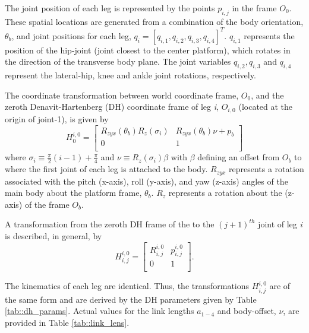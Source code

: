 			The \Jth joint position of each \Ith leg is represented  by the points ${p}_{i,j}$ in the frame $O_{0}$. These spatial locations are generated from a combination of the body orientation, $\theta_{b}$, and joint positions for each \Ith leg, $q_{i} = [q_{i,1}, q_{i,2}, q_{i,3}, q_{i,4}]^T$. $q_{i,1}$ represents the position of the hip-joint (joint closest to the center platform), which rotates in the direction of the transverse body plane. The joint variables $q_{i,2}, q_{i,3}$ and $q_{i,4}$ represent the lateral-hip, knee and ankle joint rotations, respectively.

			The coordinate transformation between world coordinate frame, $O_{0}$, and the zeroth Denavit-Hartenberg (DH) coordinate frame of leg \emph{i}, $O_{i,0}$ (located at the origin of joint-1), is given by
				\begin{equation}
					H_{0}^{i,0} = \left[ 
					\begin{array}{c|c}
						R_{zyx}(\theta_{b}) R_{z}(\sigma_{i})	&R_{zyx}(\theta_{b}) \nu + {p}_{b} 	\\ \hline
						0										&	1											\\
					\end{array} 
					\right]
					\label{eq::world_to_dh}
				\end{equation}
			where $\sigma_{i} \equiv \frac{\pi}{2}(i-1) + \frac{\pi}{4} $ and $\nu \equiv  R_{z}(\sigma_{i}) \beta$ with $\beta$ defining an offset from $O_{b}$ to where the first joint of each leg is attached to the body. $R_{zyx}$ represents a rotation associated with the pitch (x-axis), roll (y-axis), and yaw (z-axis) angles of the main body about the platform frame, $\theta_{b}$. $R_{z}$ represents a rotation about the (z-axis) of the frame $O_{b}$. 

			A transformation from the zeroth DH frame of the to the $(j+1)^{th}$ joint of leg \emph{i} is described, in general, by
				\begin{equation}
					H^{i,0}_{i,j} =
					\left[ 
					\begin{array}{c|c}
						R^{i,0}_{i,j} 	&	{p}^{i,0}_{i,j} 	\\ \hline
						0			&	1				\\
					\end{array} 
					\right].
				\end{equation}

			\noindent
			The kinematics of each leg are identical. Thus, the transformations $H^{i,0}_{i,j}$ are of the same form and are derived by the DH parameters given by Table \ref{tab::dh_params}. Actual values for the link lengths $a_{1-4}$ and body-offset, $\nu$, are provided in Table \ref{tab::link_lens}.


